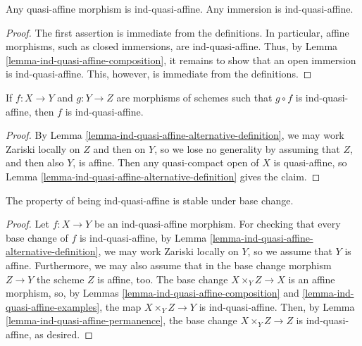 \begin{lemma}
\label{lemma-ind-quasi-affine-examples}
Any quasi-affine morphism is ind-quasi-affine.
Any immersion is ind-quasi-affine.
\end{lemma}

\begin{proof}
The first assertion is immediate from the definitions.
In particular, affine morphisms, such as closed immersions,
are ind-quasi-affine. Thus, by
Lemma \ref{lemma-ind-quasi-affine-composition}, it remains
to show that an open immersion is ind-quasi-affine.
This, however, is immediate from the definitions.
\end{proof}

\begin{lemma}
\label{lemma-ind-quasi-affine-permanence}
If $f : X \to Y$ and $g : Y \to Z$ are morphisms of schemes
such that $g \circ f$ is ind-quasi-affine, then $f$ is ind-quasi-affine.
\end{lemma}

\begin{proof}
By Lemma \ref{lemma-ind-quasi-affine-alternative-definition}, we may
work Zariski locally on $Z$ and then on $Y$, so we lose no generality
by assuming that $Z$, and then also $Y$, is affine. Then any quasi-compact
open of $X$ is quasi-affine, so
Lemma \ref{lemma-ind-quasi-affine-alternative-definition} gives the claim.
\end{proof}

\begin{lemma}
\label{lemma-base-change-ind-quasi-affine}
The property of being ind-quasi-affine is stable under base change.
\end{lemma}

\begin{proof}
Let $f : X \to Y$ be an ind-quasi-affine morphism.
For checking that every base change of $f$ is ind-quasi-affine, by
Lemma \ref{lemma-ind-quasi-affine-alternative-definition}, we may work
Zariski locally on $Y$, so we assume that $Y$ is affine.
Furthermore, we may also assume that in the base change morphism
$Z \to Y$ the scheme $Z$ is affine, too. The base change
$X \times_Y Z \to X$ is an affine morphism, so, by
Lemmas \ref{lemma-ind-quasi-affine-composition} and
\ref{lemma-ind-quasi-affine-examples},
the map $X \times_Y Z \to Y$ is ind-quasi-affine. Then, by
Lemma \ref{lemma-ind-quasi-affine-permanence}, the
base change $X \times_Y Z \to Z$ is ind-quasi-affine, as desired.
\end{proof}

